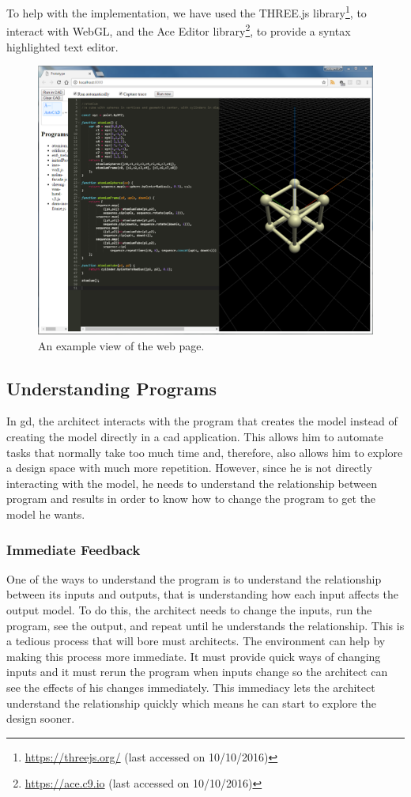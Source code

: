 To help with the implementation, we have used the THREE.js library\footnote{\url{https://threejs.org/} (last accessed on 10/10/2016)}, to interact with WebGL, and the Ace Editor library\footnote{\url{https://ace.c9.io} (last accessed on 10/10/2016)}, to provide a syntax highlighted text editor.


\begin{figure}
  \centering
  \includegraphics[width=12cm]{./images/webpage_view}
  \caption{An example view of the web page.}
  \label{fig:page:view}
\end{figure}


\subsection{Understanding Programs}
In \gls{gd}, the architect interacts with the program that creates the model instead of creating the model directly in a \gls{cad} application.
This allows him to automate tasks that normally take too much time and, therefore, also allows him to explore a design space with much more repetition.
However, since he is not directly interacting with the model, he needs to understand the relationship between program and results in order to know how to change the program to get the model he wants.


\subsubsection{Immediate Feedback}
\label{sec:immediate:feedback}
One of the ways to understand the program is to understand the relationship between its inputs and outputs, that is understanding how each input affects the output model.
To do this, the architect needs to change the inputs, run the program, see the output, and repeat until he understands the relationship.
This is a tedious process that will bore must architects.
The environment can help by making this process more immediate.
It must provide quick ways of changing inputs and it must rerun the program when inputs change so the architect can see the effects of his changes immediately.
This immediacy lets the architect understand the relationship quickly which means he can start to explore the design sooner.

